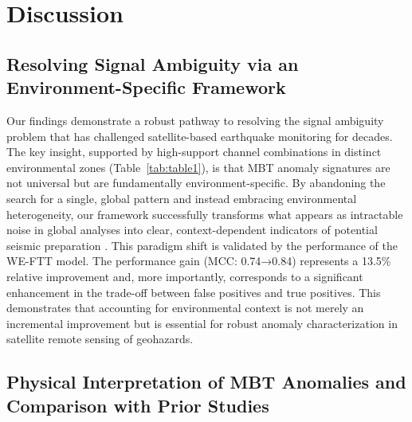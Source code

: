 \documentclass[preprint,review,12pt,authoryear]{elsarticle}
\begin{document}
\section{Discussion}\label{sec:discussion}

\subsection{Resolving Signal Ambiguity via an Environment-Specific Framework}\label{sec:discuss_ambiguity}

Our findings demonstrate a robust pathway to resolving the signal ambiguity problem that has challenged satellite-based earthquake monitoring for decades. The key insight, supported by high-support channel combinations in distinct environmental zones (Table~\ref{tab:table1}), is that MBT anomaly signatures are not universal but are fundamentally environment-specific. By abandoning the search for a single, global pattern and instead embracing environmental heterogeneity, our framework successfully transforms what appears as intractable noise in global analyses into clear, context-dependent indicators of potential seismic preparation \citep{qiSpatiotemporallyWeightedTwostep2020,qiMicrowaveBrightnessTemperature2022,wuIdentifyingSeismicAnomalies2024}. This paradigm shift is validated by the performance of the WE-FTT model. The performance gain (MCC: 0.74→0.84) represents a 13.5\% relative improvement and, more importantly, corresponds to a significant enhancement in the trade-off between false positives and true positives. This demonstrates that accounting for environmental context is not merely an incremental improvement but is essential for robust anomaly characterization in satellite remote sensing of geohazards.

\subsection{Physical Interpretation of MBT Anomalies and Comparison with Prior Studies}\label{sec:discuss_physical}
\end{document}
